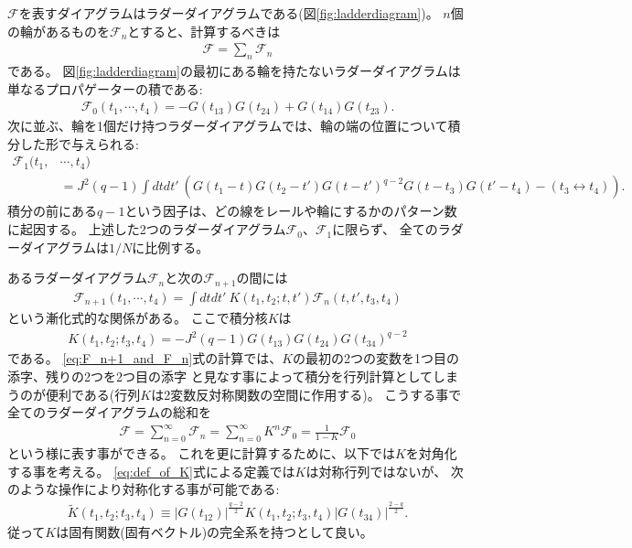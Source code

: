 $\mathcal{F}$を表すダイアグラムはラダーダイアグラムである(図\ref{fig:ladderdiagram})。
$n$個の輪があるものを$\mathcal{F}_n$とすると、計算するべきは
\begin{align}
	\mathcal{F} = \sum_n \mathcal{F}_n
\end{align}
である。
図\ref{fig:ladderdiagram}の最初にある輪を持たないラダーダイアグラムは単なるプロパゲーターの積である:
\begin{align}
	\mathcal{F}_0(t_1, \cdots, t_4) = -G(t_{13})G(t_{24}) + G(t_{14})G(t_{23}).
\end{align}
次に並ぶ、輪を1個だけ持つラダーダイアグラムでは、輪の端の位置について積分した形で与えられる:
\begin{align}
	\mathcal{F}_1(t_1, &\cdots, t_4)\nonumber\\
	&= J^2(q - 1)\int dtdt'\ \left(
		G(t_1 - t)G(t_2 - t')G(t - t')^{q-2}G(t - t_3)G(t' - t_4) - (t_3 \leftrightarrow t_4)
	\right).
\end{align}
積分の前にある$q-1$という因子は、どの線をレールや輪にするかのパターン数に起因する。
上述した2つのラダーダイアグラム$\mathcal{F}_0$、$\mathcal{F}_1$に限らず、
全てのラダーダイアグラムは$1/N$に比例する。

あるラダーダイアグラム$\mathcal{F}_n$と次の$\mathcal{F}_{n+1}$の間には
\begin{align}
	\mathcal{F}_{n+1}(t_1, \cdots, t_4)
	= \int dtdt'\ K(t_1, t_2; t, t')\mathcal{F}_n(t, t', t_3, t_4)
	\label{eq:F_n+1_and_F_n}
\end{align}
という漸化式的な関係がある。
ここで積分核$K$は
\begin{align}
	K(t_1, t_2; t_3, t_4) = -J^2(q-1)G(t_{13})G(t_{24})G(t_{34})^{q-2}
	\label{eq:def_of_K}
\end{align}
である。
\eqref{eq:F_n+1_and_F_n}式の計算では、$K$の最初の2つの変数を1つ目の添字、残りの2つを2つ目の添字
と見なす事によって積分を行列計算としてしまうのが便利である(行列$K$は2変数反対称関数の空間に作用する)。
こうする事で全てのラダーダイアグラムの総和を
\begin{align}
	\mathcal{F}
	= \sum_{n=0}^{\infty}\mathcal{F}_n
	= \sum_{n=0}^{\infty}K^n \mathcal{F}_0
	= \frac{1}{1 - K}\mathcal{F}_0
	\label{eq:geometric_series_of_F}
\end{align}
という様に表す事ができる。
これを更に計算するために、以下では$K$を対角化する事を考える。
\eqref{eq:def_of_K}式による定義では$K$は対称行列ではないが、
次のような操作により対称化する事が可能である:
\begin{align}
	\tilde{K}(t_1, t_2; t_3, t_4) \equiv
	|G(t_{12})|^{\frac{q-2}{2}}K(t_1, t_2; t_3, t_4)|G(t_{34})|^{\frac{2-q}{2}}.
	\label{eq:symmetric_K}
\end{align}
従って$K$は固有関数(固有ベクトル)の完全系を持つとして良い。

